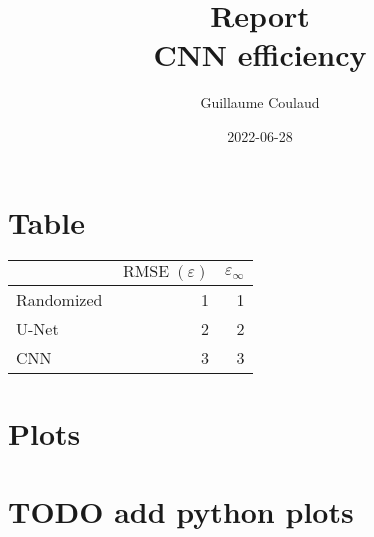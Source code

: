 \documentclass[a4paper,11pt]{article}
\author{Guillaume Coulaud}
\date{2022-06-28}
\title{Report\\\medskip
\large CNN efficiency}
\begin{document}
\maketitle
\tableofcontents



\section{Table}
\label{sec:org45834c2}
\begin{center}
\begin{tabular}{lrr}
 & \(\operatorname{RMSE}(\varepsilon)\) & \(\varepsilon_{\infty}\)\\
\hline
Randomized & 1 & 1\\
U-Net & 2 & 2\\
CNN & 3 & 3\\
\end{tabular}
\end{center}



\section{Plots}
\label{sec:org75df7cd}

\section{{\bfseries\sffamily TODO} add python plots}
\label{sec:org0830044}
\end{document}
